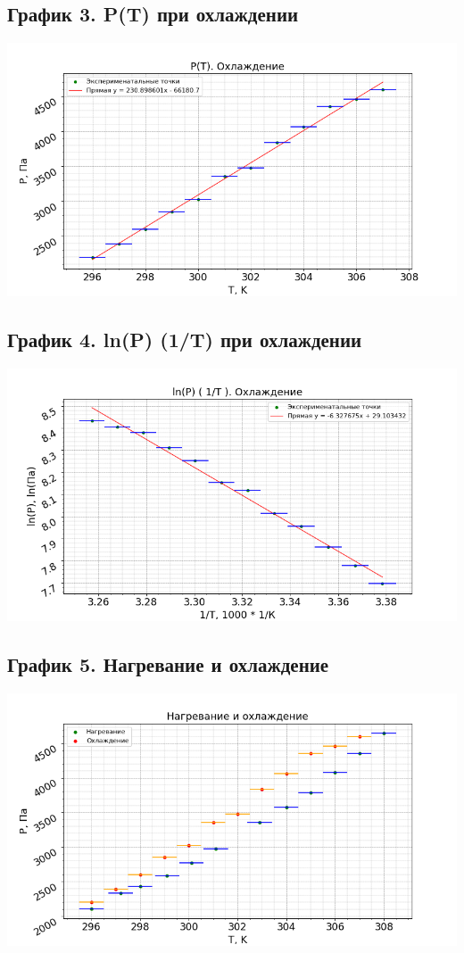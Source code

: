 \documentclass[15pt,a5paper,reqno]{article}
\begin{document}
    \subsection{График 3. P(T) при охлаждении}
    \begin{center}
        \includegraphics[width = \textwidth]{График 3.png}
    \end{center}
    
    \subsection{График 4. ln(P) (1/T) при охлаждении}
    \begin{center}
        \includegraphics[width = \textwidth]{График 4.png}
    \end{center}
    
    \subsection{График 5. Нагревание и охлаждение}
    \begin{center}
        \includegraphics[width = \textwidth]{График 5.png}
    \end{center}
\end{document}
